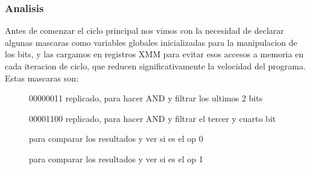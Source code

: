 \subsubsection{Analisis}
Antes de comenzar el ciclo principal nos vimos con la necesidad de declarar algunas mascaras como variables globales inicializadas para la manipulacion de los bits, y las cargamos en registros XMM para evitar esos accesos a memoria en cada iteracion de ciclo, que reducen significativamente la velocidad del programa. Estas mascaras son:

\par      
\bigskip
 \begin{figure}[!ht]
  \centering
  \caption{00000011 replicado, para hacer AND y filtrar los ultimos 2 bits}
\end{figure}

\par      
\bigskip
 \begin{figure}[!ht]
  \centering
  \caption{00001100 replicado, para hacer AND y filtrar el tercer y cuarto bit}
\end{figure}

\par      
\bigskip
 \begin{figure}[!ht]
  \centering
  \caption{para comparar los resultados y ver si es el op 0}
\end{figure}

\par      
\bigskip
 \begin{figure}[!ht]
  \centering
  \caption{para comparar los resultados y ver si es el op 1}
\end{figure}

